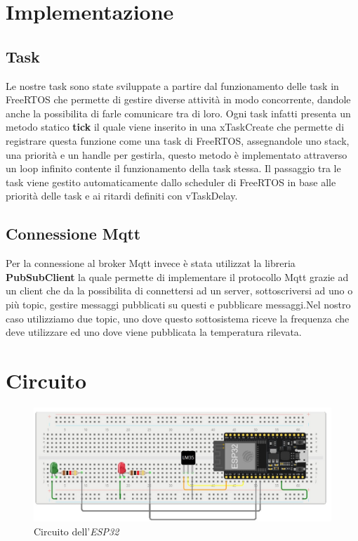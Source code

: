 \documentclass{report}
\begin{document}
\section{Implementazione}
\subsection{Task}
\par{
    Le nostre task sono state sviluppate a partire dal funzionamento delle task in FreeRTOS che permette di gestire diverse attività in modo concorrente, dandole anche la possibilita di farle comunicare tra di loro. Ogni task infatti presenta un metodo statico \textbf{tick} il quale viene inserito in una xTaskCreate che permette di registrare questa funzione come una task di FreeRTOS, assegnandole uno stack, una priorità e un handle per gestirla, questo metodo è implementato attraverso un loop infinito contente il funzionamento della task stessa. Il passaggio tra le task viene gestito automaticamente dallo scheduler di FreeRTOS in base alle priorità delle task e ai ritardi definiti con vTaskDelay.
}
\subsection{Connessione Mqtt}
\par{
    Per la connessione al broker Mqtt invece è stata utilizzat la libreria \textbf{PubSubClient} la quale permette di implementare il protocollo Mqtt grazie ad un client che da la possibilita di connettersi ad un server, sottoscriversi ad uno o più topic, gestire messaggi pubblicati su questi e pubblicare messaggi.Nel nostro caso utilizziamo due topic, uno dove questo sottosistema riceve la frequenza che deve utilizzare ed uno dove viene pubblicata la temperatura rilevata.
}
\section{Circuito}
\begin{figure}[H]
    \centering
    \includegraphics[width=\linewidth]{img/assignment-03/ESP32Circuit.jpeg}
    \caption{Circuito dell'\textit{ESP32}}
    \label{fig:esp32-circuit}
\end{figure}
%
\end{document}
